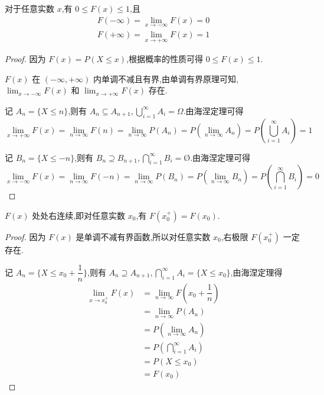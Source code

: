 \begin{property}[][有界性]
    \indent 对于任意实数 $x$,有 $0 \leqslant F(x) \leqslant 1$,且
    \begin{gather*}
        F(-\infty)= \lim_{x \to -\infty} F(x) = 0 \\
        F(+\infty)= \lim_{x \to +\infty} F(x) = 1
    \end{gather*}
\end{property}

\begin{proof}
    因为 $F(x) = P(X \leqslant x)$,根据概率的性质可得 $0 \leqslant F(x) \leqslant 1$.

    $F(x)$ 在 $(-\infty, +\infty)$ 内单调不减且有界,由单调有界原理可知, $\displaystyle\lim_{x \to -\infty} F(x)$ 和 $\displaystyle\lim_{x \to +\infty} F(x)$ 存在.

    记 $A_n = \{ X \leqslant n \}$,则有 $A_n \subseteq A_{n+1}, \displaystyle\bigcup_{i=1}^{\infty} A_i = \varOmega$.由海涅定理可得
    $$
    \lim_{x \to +\infty} F(x) = \lim_{n \to \infty} F(n) = \lim_{n \to \infty} P(A_n) = P(\lim_{n \to \infty} A_n) = P \left( \bigcup_{i=1}^{\infty} A_i \right) = 1
    $$

    记 $B_n = \{ X \leqslant -n \}$,则有 $B_n \supseteq B_{n+1}, \displaystyle\bigcap_{i=1}^{\infty} B_i = \text{\O}$.由海涅定理可得
    $$
    \lim_{x \to -\infty} F(x) = \lim_{n \to \infty} F(-n) = \lim_{n \to \infty} P(B_n) = P(\lim_{n \to \infty} B_n) = P \left( \bigcap_{i=1}^{\infty} B_i \right) = 0
    $$

    \vspace{-2em}
\end{proof}

\begin{property}[][右连续性]
    \indent $F(x)$ 处处右连续,即对任意实数 $x_0$,有 $F(x_0^+) = F(x_0)$.
\end{property}

\begin{proof}
    因为 $F(x)$ 是单调不减有界函数,所以对任意实数 $x_0$,右极限 $F(x_0^+)$ 一定存在.
    
    记 $A_n = \{ X \leqslant x_0 + \dfrac{1}{n} \}$,则有 $A_n \supseteq A_{n+1}, \displaystyle\bigcap_{i=1}^{\infty} A_i = \{ X \leqslant x_0 \}$,由海涅定理得
    $$
    \begin{aligned}
        \lim_{x \to x_0^+} F(x) &= \lim_{n \to \infty} F(x_0 + \dfrac{1}{n}) \\
        &= \lim_{n \to \infty} P(A_n) \\
        &= P(\lim_{n \to \infty} A_n) \\
        &= P \left( \bigcap_{i=1}^{\infty} A_i \right) \\
        &= P(X \leqslant x_0) \\
        &= F(x_0)
    \end{aligned}
    $$

    \vspace{-1em}
\end{proof}

